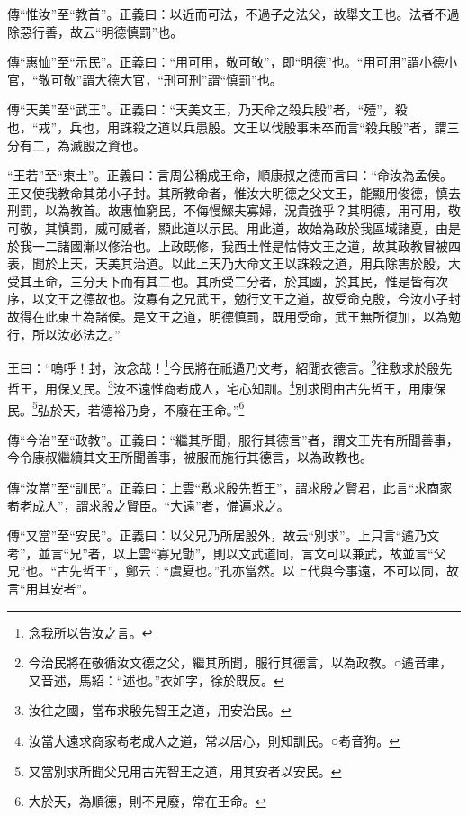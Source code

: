 {\noindent\zhuan{}\fzbyks 傳“惟汝”至“教首”。正義曰：以近而可法，不過子之法父，故舉文王也。法者不過除惡行善，故云“明德慎罰”也。 \par}

{\noindent\zhuan{}\fzbyks 傳“惠恤”至“示民”。正義曰：“用可用，敬可敬”，即“明德”也。“用可用”謂小德小官，“敬可敬”謂大德大官，“刑可刑”謂“慎罰”也。 \par}

{\noindent\zhuan{}\fzbyks 傳“天美”至“武王”。正義曰：“天美文王，乃天命之殺兵殷”者，“殪”，殺也，“戎”，兵也，用誅殺之道以兵患殷。文王以伐殷事未卒而言“殺兵殷”者，謂三分有二，為滅殷之資也。 \par}

{\noindent\shu{}\fzkt “王若”至“東土”。正義曰：言周公稱成王命，順康叔之德而言曰：“命汝為孟侯。王又使我教命其弟小子封。其所教命者，惟汝大明德之父文王，能顯用俊德，慎去刑罰，以為教首。故惠恤窮民，不侮慢鰥夫寡婦，況貴強乎？其明德，用可用，敬可敬，其慎罰，威可威者，顯此道以示民。用此道，故始為政於我區域諸夏，由是於我一二諸國漸以修治也。上政既修，我西土惟是怙恃文王之道，故其政教冒被四表，聞於上天，天美其治道。以此上天乃大命文王以誅殺之道，用兵除害於殷，大受其王命，三分天下而有其二也。其所受二分者，於其國，於其民，惟是皆有次序，以文王之德故也。汝寡有之兄武王，勉行文王之道，故受命克殷，今汝小子封故得在此東土為諸侯。是文王之道，明德慎罰，既用受命，武王無所復加，以為勉行，所以汝必法之。” \par}

王曰：“嗚呼！封，汝念哉！\footnote{念我所以告汝之言。}今民將在祇遹乃文考，紹聞衣德言。\footnote{今治民將在敬循汝文德之父，繼其所聞，服行其德言，以為政教。○遹音聿，又音述，馬紹：“述也。”衣如字，徐於既反。}往敷求於殷先哲王，用保乂民。\footnote{汝往之國，當布求殷先智王之道，用安治民。}汝丕遠惟商耇成人，宅心知訓。\footnote{汝當大遠求商家耇老成人之道，常以居心，則知訓民。○耇音狗。}別求聞由古先哲王，用康保民。\footnote{又當別求所聞父兄用古先智王之道，用其安者以安民。}弘於天，若德裕乃身，不廢在王命。”\footnote{大於天，為順德，則不見廢，常在王命。}


{\noindent\zhuan{}\fzbyks 傳“今治”至“政教”。正義曰：“繼其所聞，服行其德言”者，謂文王先有所聞善事，今令康叔繼續其文王所聞善事，被服而施行其德言，以為政教也。 \par}

{\noindent\zhuan{}\fzbyks 傳“汝當”至“訓民”。正義曰：上雲“敷求殷先哲王”，謂求殷之賢君，此言“求商家耇老成人”，謂求殷之賢臣。“大遠”者，備遍求之。 \par}

{\noindent\zhuan{}\fzbyks 傳“又當”至“安民”。正義曰：以父兄乃所居殷外，故云“別求”。上只言“遹乃文考”，並言“兄”者，以上雲“寡兄勖”，則以文武道同，言文可以兼武，故並言“父兄”也。“古先哲王”，鄭云：“虞夏也。”孔亦當然。以上代與今事遠，不可以同，故言“用其安者”。 \par}

